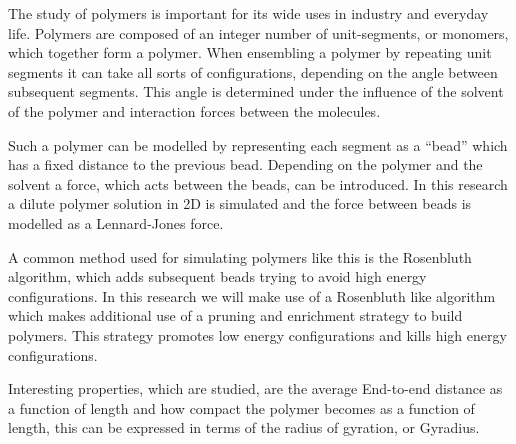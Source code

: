 The study of polymers is important for its wide uses in industry and everyday life. Polymers are composed of an integer number of unit-segments, or monomers, which together form a polymer. When ensembling a polymer by repeating unit segments it can take all sorts of configurations, depending on the angle between subsequent segments. This angle is determined under the influence of the solvent of the polymer and interaction forces between the molecules. 

Such a polymer can be modelled by representing each segment as a ``bead'' which has a fixed distance to the previous bead. Depending on the polymer and the solvent a force, which acts between the beads, can be introduced. In this research a dilute polymer solution in 2D is simulated and the force between beads is modelled as a Lennard-Jones force.

A common method used for simulating polymers like this is the Rosenbluth algorithm, which adds subsequent beads trying to avoid high energy configurations. In this research we will make use of a Rosenbluth like algorithm which makes additional use of a pruning and enrichment strategy to build polymers. This strategy promotes low energy configurations and kills high energy configurations. 

Interesting properties, which are studied, are the average End-to-end distance as a function of length and how compact the polymer becomes as a function of length, this can be expressed in terms of the radius of gyration, or Gyradius.  